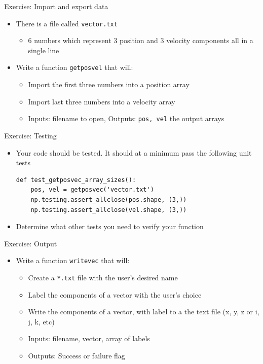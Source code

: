 \documentclass[11pt,professionalfonts]{beamer}
\begin{document}
\begin{frame}{Exercise: Import and export data}
    \begin{itemize}
        \item There is a file called \texttt{vector.txt} 
            \begin{itemize}
                \item 6 numbers which represent 3 position and 3 velocity components all in a single line
            \end{itemize}
        \item Write a function \texttt{getposvel} that will:
            \begin{itemize}
                \item Import the first three numbers into a position array
                \item Import last three numbers into a velocity array
                \item Inputs: filename to open, Outputs: \texttt{pos, vel} the output arrays
            \end{itemize}
    \end{itemize}
\end{frame}

\begin{frame}[fragile]{Exercise: Testing}
    \begin{itemize}
        \item Your code should be tested. 
            It should at a minimum pass the following unit tests
    \begin{verbatim}
def test_getposvec_array_sizes():
    pos, vel = getposvec('vector.txt')
    np.testing.assert_allclose(pos.shape, (3,))
    np.testing.assert_allclose(vel.shape, (3,))
    \end{verbatim}
    \item Determine what other tests you need to verify your function
    \end{itemize}
\end{frame}

\begin{frame}{Exercise: Output}
    \begin{itemize}
        \item Write a function \texttt{writevec} that will:
            \begin{itemize}
                \item Create a \texttt{*.txt} file with the user's desired name
                \item Label the components of a vector with the user's choice 
                \item Write the components of a vector, with label to a the text file (x, y, z or i, j, k, etc)
                \item Inputs: filename, vector, array of labels
                \item Outputs: Success or failure flag
            \end{itemize}
    \end{itemize}
\end{frame}
\end{document}
